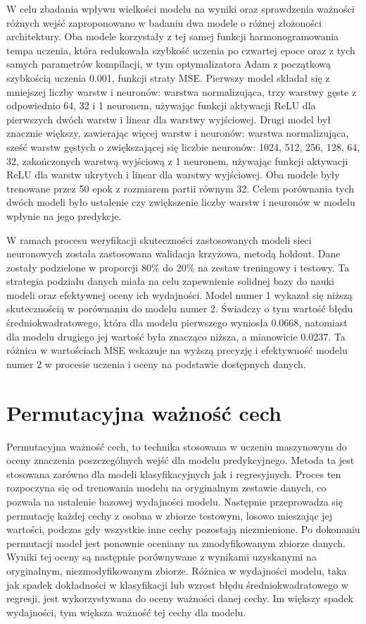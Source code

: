 \documentclass[a4paper,twoside,12pt]{book}
\begin{document}
W celu zbadania wpływu wielkości modelu na wyniki oraz sprawdzenia ważności różnych wejść zaproponowano w badaniu dwa modele o różnej złożoności architektury. Oba modele korzystały z tej samej funkcji harmonogramowania tempa uczenia, która redukowała szybkość uczenia po czwartej epoce oraz z tych samych parametrów kompilacji, w tym optymalizatora Adam z początkową szybkością uczenia 0.001, funkcji straty MSE.
Pierwszy model składał się z mniejszej liczby warstw i neuronów: warstwa normalizująca, trzy warstwy gęste z odpowiednio 64, 32 i 1 neuronem, używając funkcji aktywacji ReLU dla pierwszych dwóch warstw i linear dla warstwy wyjściowej.
Drugi model był znacznie większy, zawierając więcej warstw i neuronów: warstwa normalizująca, sześć warstw gęstych o zwiększającej się liczbie neuronów: 1024, 512, 256, 128, 64, 32, zakończonych warstwą wyjściową z 1 neuronem, używając funkcji aktywacji ReLU dla warstw ukrytych i linear dla warstwy wyjściowej.
Oba modele były trenowane przez 50 epok z rozmiarem partii równym 32. Celem porównania tych dwóch modeli było ustalenie czy zwiększenie liczby warstw i neuronów w modelu wpłynie na jego predykcje.

W ramach procesu weryfikacji skuteczności zastosowanych modeli sieci neuronowych została zastosowana walidacja krzyżowa, metodą holdout. Dane zostały podzielone w proporcji 80\% do 20\% na zestaw treningowy i testowy. Ta strategia podziału danych miała na celu zapewnienie solidnej bazy do nauki modeli oraz efektywnej oceny ich wydajności. Model numer 1 wykazał się niższą skutecznością w porównaniu do modelu numer 2. Świadczy o tym wartość błędu średniokwadratowego, która dla modelu pierwszego wyniosła 0.0668, natomiast dla modelu drugiego jej wartość była znacząco niższa, a mianowicie 0.0237. Ta różnica w wartościach MSE wskazuje na wyższą precyzję i efektywność modelu numer 2 w procesie uczenia i oceny na podstawie dostępnych danych.
\newpage
\section{Permutacyjna ważność cech}
Permutacyjna ważność cech, to technika stosowana w uczeniu maszynowym do oceny znaczenia poszczególnych wejść dla modelu predykcyjnego. Metoda ta jest stosowana zarówno dla modeli klasyfikacyjnych jak i regresyjnych. Proces ten rozpoczyna się od trenowania modelu na oryginalnym zestawie danych, co pozwala na ustalenie bazowej wydajności modelu. Następnie przeprowadza się permutację każdej cechy z osobna w zbiorze testowym, losowo mieszając jej wartości, podczas gdy wszystkie inne cechy pozostają niezmienione. Po dokonaniu permutacji model jest ponownie oceniany na zmodyfikowanym zbiorze danych. Wyniki tej oceny są następnie porównywane z wynikami uzyskanymi na oryginalnym, niezmodyfikowanym zbiorze. Różnica w wydajności modelu, taka jak spadek dokładności w klasyfikacji lub wzrost błędu średniokwadratowego w regresji, jest wykorzystywana do oceny ważności danej cechy. Im większy spadek wydajności, tym większa ważność tej cechy dla modelu.
\end{document}
